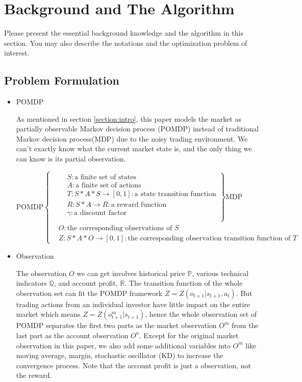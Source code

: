\section{Background and The Algorithm}
\label{section:algorithm}
Please present the essential background knowledge and the algorithm in this section. You may also describe the notations and the optimization problem of interest.

\subsection{Problem Formulation}
\begin{itemize}
\item POMDP

As mentioned in section \ref{section:intro}, this paper models the market as partially observable Markov decision process (POMDP) instead of traditional Markov decision process(MDP) due to the noisy trading environment. We can't exactly know what the current market state is, and the only thing we can know is its partial observation.

$$
\text{POMDP}
\left\{
\begin{aligned}
&\left.
\begin{aligned}
&S : \text{a finite set of states} \\
&A : \text{a finite set of actions} \\
&T : S*A*S \rightarrow [0,1] : \text{a state transition function} \\
&R : S*A \rightarrow R : \text{a reward function} \\
&\gamma : \text{a discount factor} \\
\end{aligned}
\right\} \text{MDP}\\
&O : \text{the corresponding observations of $S$} \\
&Z : S*A*O \rightarrow [0,1] : \text{the corresponding observation transition function of $T$}
\end{aligned}
\right.
$$

\item Observation

The observation $O$ we can get involves historical price $\mathbb{P}$, various technical indicators $\mathbb{Q}$, and account profit, $\mathbb{R}$. The transition function of the whole observation set can fit the POMDP framework $Z=Z(o_{t+1}|s_{t+1},a_t)$. But trading actions from an individual investor have little impact on the entire market which means $Z=Z(o^m_{t+1}|s_{t+1})$, hence the whole observation set of POMDP separates the first two parts as the market observation $O^m$ from the last part as the account observation $O^a$. Except for the original market observation in this paper, we also add some additional variables into $O^m$ like moving average, margin, stochastic oscillator (KD) to increase the convergence process. Note that the account profit is just a observation, not the reward.


\end{itemize}
